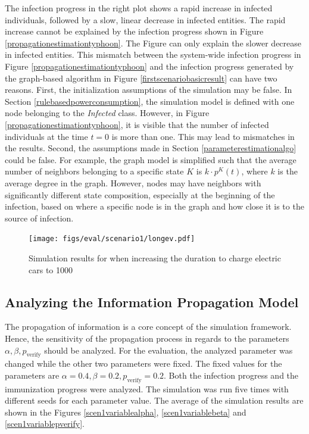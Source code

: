 The infection progress in the right plot shows a rapid increase in infected 
individuals, followed by a slow, linear decrease in infected entities.
The rapid increase cannot be explained by the 
infection progress shown in Figure \ref{propagationestimationtyphoon}.
The Figure can only explain the slower decrease in infected entities. 
This mismatch between
the system-wide infection progress in Figure \ref{propagationestimationtyphoon}
and the infection progress generated by the graph-based algorithm 
in Figure \ref{firstscenariobasicresult} can have two reasons. 
First, the initialization assumptions of the simulation may be false.
In Section \ref{rulebasedpowerconsumption}, the simulation model
is defined with one node belonging to the \textit{Infected} class.
However, in Figure \ref{propagationestimationtyphoon}, it
is visible that the number of infected individuals at the 
time $t=0$ is more than one. This may lead to mismatches 
in the results. Second, the assumptions made in Section 
\ref{parameterestimationalgo} could be false. For example, 
the graph model is simplified such that the average number of 
neighbors belonging to a specific state $K$ is $k\cdot p^K(t)$, 
where $k$ is the average degree in the graph. However, nodes may 
have neighbors with significantly different state composition, 
especially at the beginning of the infection, based on where a specific 
node is in the graph and how close it is to the source of 
infection.

\begin{figure}[!ht]
    \center
    \texttt{[image: figs/eval/scenario1/longev.pdf]}
    \caption{Simulation results for when increasing the duration to 
    charge electric cars to 1000}
    \label{firstscenariobasicevchange}
\end{figure}

\subsection{Analyzing the Information Propagation Model}

The propagation of information is a core concept of the simulation framework.
Hence, the sensitivity of the propagation process 
in regards to the parameters $\alpha, \beta, p_{\mathrm{verify}}$ 
should be analyzed. For the evaluation, the analyzed parameter was changed
while the other two parameters were fixed.
The fixed values for the parameters are 
$\alpha=0.4, \beta=0.2, p_{\mathrm{verify}}=0.2$. 
Both the infection progress and 
the immunization progress were analyzed.
The simulation was run five times with different seeds 
for each parameter value. The average of the simulation 
results are shown in the Figures \ref{scen1variablealpha},
\ref{scen1variablebeta} and \ref{scen1variablepverify}.


